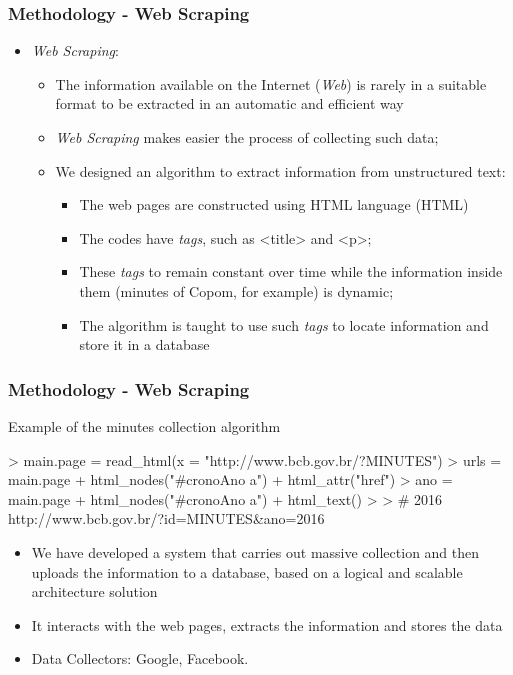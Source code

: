 \documentclass[aspectratio=169]{beamer}
\begin{document}
\begin{frame}\frametitle{Methodology - Web Scraping}
  \begin{itemize}
  \item \emph{Web Scraping}:
    \begin{itemize}
      \item The information available on the Internet (\emph{Web}) is rarely in a suitable format to be extracted in an automatic and efficient way
      \item \emph{Web Scraping} makes easier the process of collecting such data;
      \item We designed an algorithm to extract information from unstructured text:
      \begin{itemize}
        \item The web pages are constructed using HTML language (HTML)
        \item The codes have \emph{tags}, such as <title> and <p>;
        \item These \emph{tags} to remain constant over time while the information inside them (minutes of Copom, for example) is dynamic;
        \item The algorithm is taught to use such \emph{tags} to locate information and store it in a database
      \end{itemize}
    \end{itemize}
  \end{itemize}
\end{frame}

\begin{frame}[fragile]\frametitle{Methodology - Web Scraping} 
  \begin{block}{Example of the minutes collection algorithm}
\begin{Schunk}
\begin{Sinput}
> main.page = read_html(x = "http://www.bcb.gov.br/?MINUTES")
> urls = main.page %
+   html_nodes("#cronoAno a") %
+   html_attr("href")  
> ano = main.page %
+   html_nodes("#cronoAno a") %
+   html_text() 
> 
> # 2016 http://www.bcb.gov.br/?id=MINUTES&ano=2016                                               
\end{Sinput}
\end{Schunk}
  \end{block}
  \begin{itemize}
    \item We have developed a system that carries out massive collection and then uploads the information to a database, based on a logical and scalable architecture solution
    \item It interacts with the web pages, extracts the information and stores the data
    \item Data Collectors: Google, Facebook.
  \end{itemize}
\end{frame}
\end{document}
